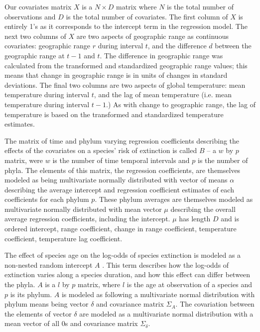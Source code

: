 \documentclass[12pt,letterpaper]{article}
\begin{document}
\begin{refsection}
Our covariates matrix \(X\) is a \(N \times D\) matrix where \(N\) is the total number of observations and \(D\) is the total number of covariates. The first column of \(X\) is entirely 1's as it corresponds to the intercept term in the regression model. The next two columns of \(X\) are two aspects of geographic range as continuous covariates: geographic range \(r\) during interval \(t\), and the difference \(d\) between the geographic range at \(t - 1\) and \(t\). The difference in geographic range was calculated from the transformed and standardized geographic range values; this means that change in geographic range is in units of changes in standard deviations. The final two columns are two aspects of global temperature: mean temperature during interval \(t\), and the lag of mean temperature (i.e. mean temperature during interval \(t - 1\).) As with change to geographic range, the lag of temperature is based on the transformed and standardized temperature estimates. 

The matrix of time and phylum varying regression coefficients describing the effects of the covariates on a species' risk of extinction is called \(B\) -- a  \(w\) by \(p\) matrix, were \(w\) is the number of time temporal intervals and \(p\) is the number of phyla. The elements of this matrix, the regression coefficients, are themselves modeled as being multivariate normally distributed with vector of means \(\alpha\) describing the average intercept and regression coefficient estimates of each coefficients for each phylum \(p\). These phylum averages are themselves modeled as multivariate normally distributed with mean vector \(\mu\) describing the overall average regression coefficients, including the intercept. \(\mu\) has length \(D\) and is ordered intercept, range coefficient, change in range coefficient, temperature coefficient, temperature lag coefficient.

The effect of species age on the log-odds of species extinction is modeled as a non-nested random intercept \(A\) \citep{Tutz2016}. This term describes how the log-odds of extinction varies along a species duration, and how this effect can differ between the phyla. \(A\) is a \(l\) by \(p\) matrix, where \(l\) is the age at observation of a species and \(p\) is its phylum. \(A\) is modeled as following a multivariate normal distribution with phylum means being vector \(\delta\) and covariance matrix \(\Sigma_{A}\). The covariation between the elements of vector \(\delta\) are modeled as a multivariate normal distribution with a mean vector of all 0s and covariance matrix \(\Sigma_{\delta}\).


\end{refsection}
\end{document}
